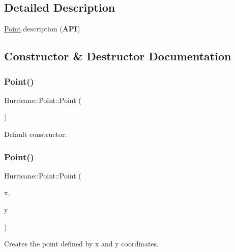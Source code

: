 \subsection{Detailed Description}
\mbox{\hyperlink{classHurricane_1_1Point}{Point}} description ({\bfseries A\+PI}) 

\subsection{Constructor \& Destructor Documentation}
\mbox{\label{classHurricane_1_1Point_a54c8ad2b1f3005ac1564c0fd7d5ef5b7}} 
\subsubsection{\texorpdfstring{Point()}{Point()}\hspace{0.1cm}{\footnotesize\ttfamily [1/3]}}
{\footnotesize\ttfamily Hurricane\+::\+Point\+::\+Point (\begin{DoxyParamCaption}{ }\end{DoxyParamCaption})}

Default constructor. \mbox{\label{classHurricane_1_1Point_a871672d833661cc79101d1e43d4d8325}} 
\subsubsection{\texorpdfstring{Point()}{Point()}\hspace{0.1cm}{\footnotesize\ttfamily [2/3]}}
{\footnotesize\ttfamily Hurricane\+::\+Point\+::\+Point (\begin{DoxyParamCaption}\item[{const \mbox{\hyperlink{group__DbUGroup_ga4fbfa3e8c89347af76c9628ea06c4146}{Db\+U\+::\+Unit}} \&}]{x,  }\item[{const \mbox{\hyperlink{group__DbUGroup_ga4fbfa3e8c89347af76c9628ea06c4146}{Db\+U\+::\+Unit}} \&}]{y }\end{DoxyParamCaption})}

Creates the point defined by x and y coordinates. \mbox{\label{classHurricane_1_1Point_a8840ca5f42bec6203058911ea0ba6cb9}} 
